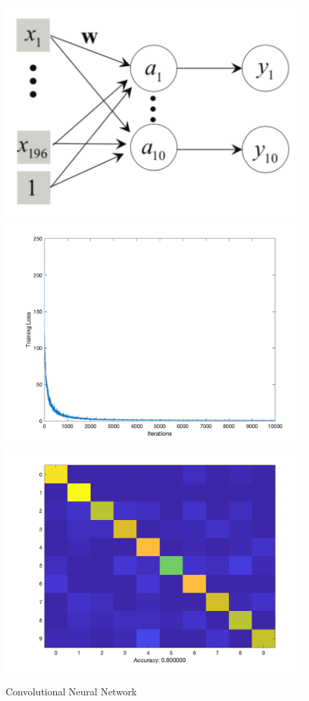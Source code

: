 \documentclass[letter, 11pt]{article}
\begin{document}
\begin{figure}[H]
        \centering
        \includegraphics[width=\textwidth]{HW4/RESULT/SLP_linear.png}
    \endminipage\hfill
        \centering
        \includegraphics[width=1.1\textwidth]{HW4/RESULT/SLP_linear_loss.png}
    \endminipage\hfill
        \centering
        \includegraphics[width=1.1\textwidth]{HW4/RESULT/SLPLINEAR_CONFUSION.png}
    \endminipage\hfill
    \caption{Convolutional Neural Network}
\end{figure}
\end{document}
